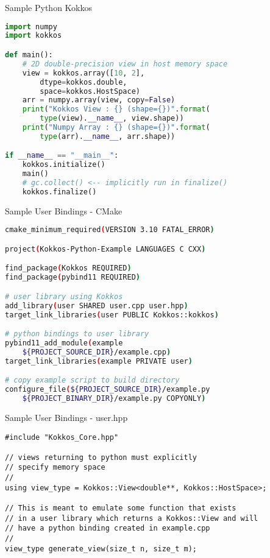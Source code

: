 \begin{frame}[fragile]{Sample Python Kokkos}
\begin{lstlisting}[language=python,showstringspaces=false]
import numpy
import kokkos

def main():
    # 2D double-precision view in host memory space
    view = kokkos.array([10, 2], 
        dtype=kokkos.double,
        space=kokkos.HostSpace)
    arr = numpy.array(view, copy=False)
    print("Kokkos View : {} (shape={})".format(
        type(view).__name__, view.shape))
    print("Numpy Array : {} (shape={})".format(
        type(arr).__name__, arr.shape))

if __name__ == "__main__":
    kokkos.initialize()
    main()
    # gc.collect() <-- implicitly run in finalize()
    kokkos.finalize()
\end{lstlisting}

\end{frame}

\begin{frame}[fragile]{Sample User Bindings - CMake}
\begin{lstlisting}[language=bash]
cmake_minimum_required(VERSION 3.10 FATAL_ERROR)

project(Kokkos-Python-Example LANGUAGES C CXX)

find_package(Kokkos REQUIRED)
find_package(pybind11 REQUIRED)

# user library using Kokkos
add_library(user SHARED user.cpp user.hpp)
target_link_libraries(user PUBLIC Kokkos::kokkos)

# python bindings to user library
pybind11_add_module(example
    ${PROJECT_SOURCE_DIR}/example.cpp)
target_link_libraries(example PRIVATE user)

# copy example script to build directory
configure_file(${PROJECT_SOURCE_DIR}/example.py
    ${PROJECT_BINARY_DIR}/example.py COPYONLY)
\end{lstlisting}
\end{frame}

\begin{frame}[fragile]{Sample User Bindings - user.hpp}
\begin{lstlisting}
#include "Kokkos_Core.hpp"

// views returning to python must explicitly
// specify memory space
//
using view_type = Kokkos::View<double**, Kokkos::HostSpace>;

// This is meant to emulate some function that exists 
// in a user library which returns a Kokkos::View and will 
// have a python binding created in example.cpp
//
view_type generate_view(size_t n, size_t m);
\end{lstlisting}
\end{frame}

